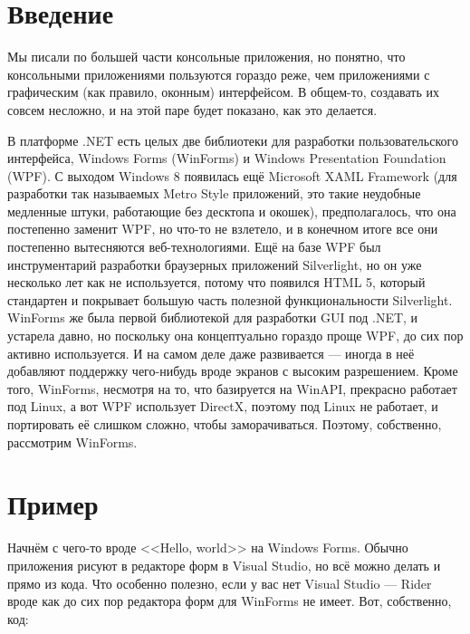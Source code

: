 \documentclass{../../text-style}
\begin{document}
\maketitle
\thispagestyle{empty}

\section{Введение}

Мы писали по большей части консольные приложения, но понятно, что консольными приложениями пользуются гораздо реже, чем приложениями с графическим (как правило, оконным) интерфейсом. В общем-то, создавать их совсем несложно, и на этой паре будет показано, как это делается. 

В платформе .NET есть целых две библиотеки для разработки пользовательского интерфейса, Windows Forms (WinForms) и Windows Presentation Foundation (WPF). С выходом Windows 8 появилась ещё Microsoft XAML Framework (для разработки так называемых Metro Style приложений, это такие неудобные медленные штуки, работающие без десктопа и окошек), предполагалось, что она постепенно заменит WPF, но что-то не взлетело, и в конечном итоге все они постепенно вытесняются веб-технологиями. Ещё на базе WPF был инструментарий разработки браузерных приложений Silverlight, но он уже несколько лет как не используется, потому что появился HTML 5, который стандартен и покрывает большую часть полезной функциональности Silverlight. WinForms же была первой библиотекой для разработки GUI под .NET, и устарела давно, но поскольку она концептуально гораздо проще WPF, до сих пор активно используется. И на самом деле даже развивается --- иногда в неё добавляют поддержку чего-нибудь вроде экранов с высоким разрешением. Кроме того, WinForms, несмотря на то, что базируется на WinAPI, прекрасно работает под Linux, а вот WPF использует DirectX, поэтому под Linux не работает, и портировать её слишком сложно, чтобы заморачиваться. Поэтому, собственно, рассмотрим WinForms.

\section{Пример}

Начнём с чего-то вроде <<Hello, world>> на Windows Forms. Обычно приложения рисуют в редакторе форм в Visual Studio, но всё можно делать и прямо из кода. Что особенно полезно, если у вас нет Visual Studio --- Rider вроде как до сих пор редактора форм для WinForms не имеет. Вот, собственно, код:
\end{document}
